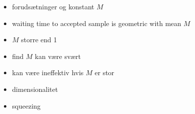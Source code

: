 \begin{frame}
	\begin{itemize}
		\item forudsætninger og konstant $M$
		\item waiting time to accepted sample is geometric with mean $M$
		\item $M$ storre end 1
		\item find $M$ kan være svært
		\item kan være ineffektiv hvis $M$ er stor
		\item dimensionalitet
		\item squeezing
	\end{itemize}
\end{frame}

% 